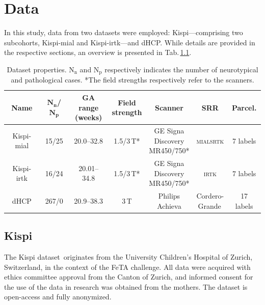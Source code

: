 \chapter{Data} \label{chap:Data}
\vspace{1cm}

In this study, data from two datasets were employed: Kispi---comprising two subcohorts, Kispi-mial and Kispi-irtk---and dHCP. While details are provided in the respective sections, an overview is presented in Tab.\,\ref{tab:datasets}.
\begin{table}[htbp]
    \centering
    \begin{tabular}{c|c|c|c|c|c|c}
        \toprule
        \textbf{Name} & $\textbf{N}_\textbf{n}$\textbf{/}$\textbf{N}_\textbf{p}$ & \makecell{\textbf{GA range} \\ \textbf{(weeks)}} & \makecell{\textbf{Field} \\ \textbf{strength}} & \textbf{Scanner} & \textbf{SRR} & \textbf{Parcel.} \\
        \midrule
        Kispi-mial & 15/25 & 20.0--32.8 & 1.5/3\,T* & \makecell{GE Signa \\ Discovery \\ MR450/750*} & \makecell{\textsc{mialsrtk} \\ \cite{Tourbier2015}} & 7 labels \\ \hline
        Kispi-irtk & 16/24 & 20.01--34.8 & 1.5/3\,T* & \makecell{GE Signa \\ Discovery \\ MR450/750*} & \makecell{\textsc{irtk} \\ \cite{Kuklisova2012}} & 7 labels \\ \hline
        dHCP & 267/0 & 20.9--38.3 & 3\,T & \makecell{Philips \\ Achieva} & \makecell{Cordero- \\ Grande\,\cite{CorderoGrande2018}} & 17 labels \\
        \bottomrule
    \end{tabular}
    \caption{Dataset properties. $\text{N}_\text{n}$ and $\text{N}_\text{p}$ respectively indicates the number of neurotypical and pathological cases. *The field strengths respectively refer to the scanners.}
    \label{tab:datasets}
\end{table}

\section{Kispi}
The Kispi dataset\,\cite{Payette2021, FeTA_MICCAI} originates from the University Children's Hospital of Zurich, Switzerland, in the context of the FeTA challenge. All data were acquired with ethics committee approval from the Canton of Zurich, and informed consent for the use of the data in research was obtained from the mothers. The dataset is open-access and fully anonymized.

